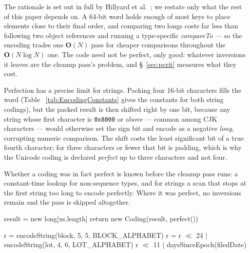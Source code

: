 \documentclass[twoside,leqno,twocolumn]{article}
\begin{document}
The rationale is set out in full by Hillyard et al.~\cite{huskysort2020}; we restate only what the rest of
this paper depends on.
A 64-bit word holds enough of most keys to place elements close to their final order, and comparing two
longs costs far less than following two object references and running a type-specific
\textit{compareTo} --- so the encoding trades one $\textbf{O}(N)$ pass for cheaper comparisons throughout
the $\textbf{O}(N \log N)$ one.
The code need not be perfect, only good: whatever inversions it leaves are the cleanup pass's problem, and
\S~\ref{sec:pcrit} measures what they cost.

Perfection has a precise limit for strings.
Packing four 16-bit characters fills the word (Table ~\ref{tab:EncodingConstants} gives the constants for
both string codings), but the packed result is then shifted right by one bit, because any string whose
first character is \texttt{0x8000} or above --- common among CJK characters --- would otherwise set the
sign bit and encode as a negative \textit{long}, corrupting numeric comparison.
The shift costs the least significant bit of a true fourth character; for three characters or fewer that
bit is padding, which is why the Unicode coding is declared \textit{perfect} up to three characters and
not four.

Whether a coding was in fact perfect is known before the cleanup pass runs: a constant-time lookup for
non-sequence types, and for strings a scan that stops at the first string too long to encode perfectly.
Where it was perfect, no inversions remain and the pass is skipped altogether.


\begin{algorithm2e}
 result = new long[xs.length]\;
 return new Coding(result, perfect())\;
 \caption{huskyEncode}
 \label{alg:the_alg2}
\end{algorithm2e}


\begin{algorithm2e}
 r = encodeString(block, 5, 5, BLOCK\_ALPHABET)\;
 r = r $\ll$ 24 $|$ encodeString(lot, 4, 6, LOT\_ALPHABET)\;
 \Return r $\ll$ 11 $|$ daysSinceEpoch(filedDate)\;
 \BlankLine
 \caption{A composite husky coder: \textit{PermitCoder}. \textit{encodeString} packs \textit{width}
   symbols of \textit{bits} each, right-padding with zero.}
 \label{alg:permitcoder}
\end{algorithm2e}
\end{document}
